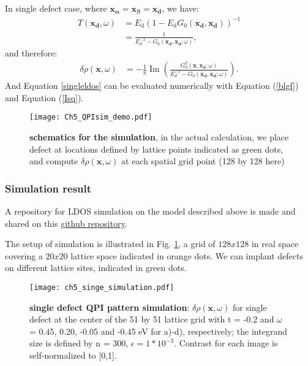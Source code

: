 In single defect case, where $\mathbf{x_\alpha} = \mathbf{x_\beta} = \mathbf{x_d}$, we have: 
\begin{align}
	T(\mathbf{x_d},\omega) &= E_{\text{d}} \left( 1 - E_{\text{d}} G_0(\mathbf{x_d}, \mathbf{x_d}) \right)^{-1} \label{T_matrix_ele} \\
	&= \frac{1}{E_{\text{d}}^{-1} - G_0(\mathbf{x_d}, \mathbf{x_d}; \omega)},
\end{align}
and therefore: 
\begin{align}
	\delta\rho(\mathbf{x},\omega) &= - \frac{1}{\pi} \operatorname{Im}(\frac{G_0^2(\mathbf{x},\mathbf{x_d};\omega)}{E_d^{-1} - G_0(\mathbf{x_d},\mathbf{x_d};\omega)}) \label{singleldos}. 
\end{align}
And Equation \ref{singleldos} can be evaluated numerically with Equation (\ref{blgf}) and Equation (\ref{Isq}).

\begin{figure}
	\centering
	\texttt{[image: Ch5\_QPIsim\_demo.pdf]}
	\caption[\textbf{schematics for the simulation}]{\textbf{schematics for the simulation}, in the actual calculation, we place defect at locations defined by lattice points indicated as green dots, and compute $\delta\rho(\textbf{x},\omega)$ at each spatial grid point (128 by 128 here)}
	\label{fig:ch5_qpisim_demo}
\end{figure}

\subsubsection{Simulation result}
A repository for \ac{LDOS} simulation on the model described above is made and shared on this \href{https://github.com/Plswearpants/QPI\_simulation}{github repository}.

The setup of simulation is illustrated in Fig. \ref{fig:ch5_qpisim_demo}, a grid of $128x128$ in real space covering a $20x20$ lattice space indicated in orange dots. We can implant defects on different lattice sites, indicated in green dots. 

\begin{figure}
	\centering
	\texttt{[image: ch5\_singe\_simulation.pdf]} %
	\caption[\textbf{single defect QPI pattern simulation}]{\textbf{single defect QPI pattern simulation}: $\delta\rho(\textbf{x},\omega)$ for single defect at the center of the 51 by 51 lattice grid with t = -0.2 and $\omega$ = 0.45, 0.20, -0.05 and -0.45 eV for a)-d), respectively; the integrand size is defined by n = 300, $\epsilon = 1*10^{-3}$. Contrast for each image is self-normalized to [0,1].}
	\label{fig:ch5_single_scattering}
\end{figure}

